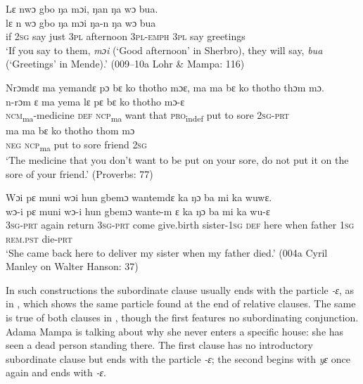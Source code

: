 \ea%
    \label{ex:235}
    \ea \label{ex:235a} Lɛ nwɔ gbo ŋa mɔi, ŋan ŋa wɔ bua.\\
    \gll lɛ  n    wɔ    gbo  ŋa    mɔi      ŋa-n      ŋa    wɔ    bua\\
    if  \textsc{2sg}  say  just  3\textsc{pl}  afternoon  \textsc{3pl-emph}  \textsc{3pl}  say  greetings\\
    \glt ‘If you say to them, \textit{mɔi} (‘Good afternoon' in Sherbro), they will say,  \textit{bua} (‘Greetings' in Mende).' (009--10a Lohr \& Mampa: 116)

    \ex \label{ex:235b} Nrɔmdɛ ma yemandɛ pɔ bɛ ko thotho mɔɛ, ma ma bɛ ko thotho thɔm mɔ.\\
    \gll n-rɔm          ɛ    ma    yema    lɛ    pɛ      bɛ    ko    thotho  mɔ-ɛ\\
    \textsc{ncm}\textsubscript{ma}{}-medicine  \textsc{def}  \textsc{ncp}\textsubscript{ma}    want    that  \textsc{pro}\textsubscript{indef}  put  to    sore    \textsc{2sg}{}-\textsc{prt}\\
    \gll ma    ma    bɛ    ko    thotho  thom    mɔ\\
    \textsc{neg}  \textsc{ncp}\textsubscript{ma}   put  to    sore    friend    \textsc{2sg}\\
    \glt ‘The medicine that you don't want to be put on your sore, do not put it on the sore of your friend.' (Proverbs: 77)

    \ex \label{ex:235c} Wɔi pɛ muni wɔi hun gbemɔ wantemdɛ ka ŋɔ ba mi ka wuwɛ.\\
    \gll wɔ-i    pɛ      muni    wɔ{}-i    hun    gbemɔ    wante{}-m    ɛ    ka ŋɔ      ba      mi    ka      wu-ɛ\\
    \textsc{3sg-prt}  again    return    \textsc{3sg-prt}  come    give.birth  sister-\textsc{1sg}  \textsc{def}  here  when    father    \textsc{1sg}  \textsc{rem.pst}  die-\textsc{prt}\\
    \glt ‘She came back here to deliver my sister when my father died.' (004a Cyril Manley on Walter Hanson: 37)
\z
\z

In such constructions the subordinate clause usually ends with the particle \textit{{}-ɛ}, as in , which shows the same particle found at the end of relative clauses. The same is true of both clauses in , though the first features no subordinating conjunction. Adama Mampa is talking about why she never enters a specific house: she has seen a dead person standing there. The first clause has no introductory subordinate clause but ends with the particle \textit{{}-ɛ}; the second begins with \textit{yɛ} once again and ends with \textit{{}-ɛ}.

